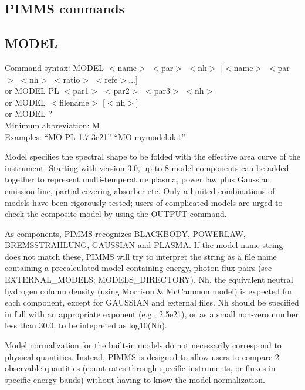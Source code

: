 \documentclass[11pt]{article}
\begin{document}
\begin{appendices}

\section{PIMMS commands}

\subsection{MODEL}

Command syntax: MODEL $<$name$>$ $<$par$>$ $<$nh$>$ [$<$name$>$ $<$par$>$ $<$nh$>$ $<$ratio$>$ $<$refe$>$...] \\
\hspace{1.5 cm} or MODEL PL $<$par1$>$ $<$par2$>$ $<$par3$>$ $<$nh$>$ \\
\hspace{1.5 cm} or MODEL $<$filename$>$ [$<$nh$>$] \\
\hspace{1.5 cm} or MODEL ? \\
Minimum abbreviation: M \\
Examples: ``MO PL 1.7 3e21'' ``MO mymodel.dat'' \\
\vspace{0.5 cm}

Model specifies the spectral shape to be folded  with the effective area curve
of the instrument.  Starting with version 3.0, up to 8 model components can be
added together to represent multi-temperature plasma,  power law plus Gaussian
emission line, partial-covering absorber etc.   Only a limited combinations of
models have been rigorously tested;   users of complicated models are urged to 
check the composite model by using the OUTPUT command.

As components, PIMMS recognizes  BLACKBODY, POWERLAW, BREMSSTRAHLUNG, GAUSSIAN
and PLASMA.   If the model name string does  not match these, PIMMS will
try to interpret the string  as a file name containing  a precalculated  model
containing energy, photon flux pairs (see EXTERNAL\_MODELS; MODELS\_DIRECTORY).
Nh, the equivalent neutral hydrogen column density  (using Morrison \& McCammon
model) is expected for each component, except for GAUSSIAN and external files.
Nh should be specified in full with an appropriate exponent (e.g., 2.5e21), or
as a small non-zero number less than 30.0, to be intepreted as log10(Nh).

Model normalization for the built-in models do not necessarily correspond to
physical quantities.  Instead, PIMMS is designed to allow users to compare 2
observable quantities (count rates through specific instruments, or fluxes in
specific energy bands) without having to know the model normalization.


\end{appendices}
\end{document}
